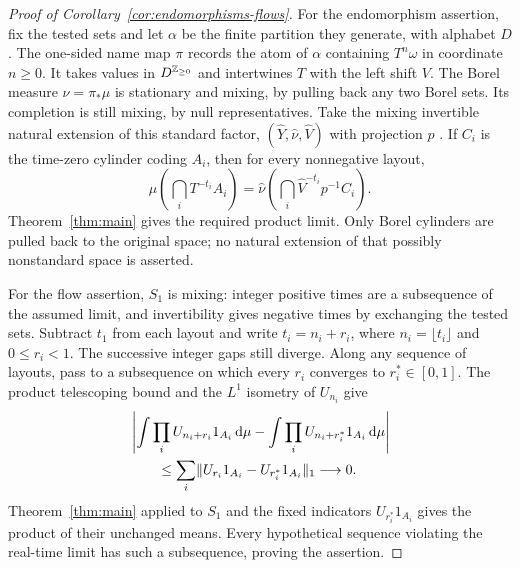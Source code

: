 \begin{proof}[Proof of Corollary~\ref{cor:endomorphisms-flows}]
For the endomorphism assertion, fix the tested sets and let $\alpha$ be
the finite partition they generate, with alphabet $D$. The one-sided
name map $\pi$ records the atom of $\alpha$ containing $T^n\omega$ in
coordinate $n\ge0$. It takes values in $D^{\mathbb Z_{\ge0}}$ and intertwines
$T$ with the left shift $V$. The Borel measure $\nu=\pi_*\mu$ is
stationary and mixing, by pulling back any two Borel sets. Its completion
is still mixing, by null representatives. Take the mixing invertible
natural extension of this standard factor,
$(\widehat Y,\widehat\nu,\widehat V)$ with projection $p$
\cite[Section~9]{Rokhlin1960}. If $C_i$ is the time-zero cylinder coding
$A_i$, then for every nonnegative layout,
\[
 \mu\left(\bigcap_iT^{-t_i}A_i\right)
 =\widehat\nu\left(\bigcap_i\widehat V^{-t_i}p^{-1}C_i\right).
\]
Theorem~\ref{thm:main} gives the required product limit. Only Borel
cylinders are pulled back to the original space; no natural extension
of that possibly nonstandard space is asserted.

For the flow assertion, $S_1$ is mixing: integer positive times are a
subsequence of the assumed limit, and invertibility gives negative times
by exchanging the tested sets. Subtract $t_1$ from each layout and write
$t_i=n_i+r_i$, where $n_i=\lfloor t_i\rfloor$ and $0\le r_i<1$.
The successive integer gaps still diverge. Along any sequence of layouts,
pass to a subsequence on which every $r_i$ converges to $r_i^*\in[0,1]$.
The product telescoping bound and the $L^1$ isometry of $U_{n_i}$ give
\[
 \begin{aligned}
 &\left|\int\prod_iU_{n_i+r_i}1_{A_i}\,\mathrm d\mu
       -\int\prod_iU_{n_i+r_i^*}1_{A_i}\,\mathrm d\mu\right|\\
 &\qquad\le\sum_i\lVert U_{r_i}1_{A_i}-U_{r_i^*}1_{A_i}\rVert_1
 \longrightarrow0.
 \end{aligned}
\]
Theorem~\ref{thm:main} applied to $S_1$ and the fixed indicators
$U_{r_i^*}1_{A_i}$ gives the product of their unchanged means.
Every hypothetical sequence violating the real-time limit has such a
subsequence, proving the assertion.
\end{proof}
